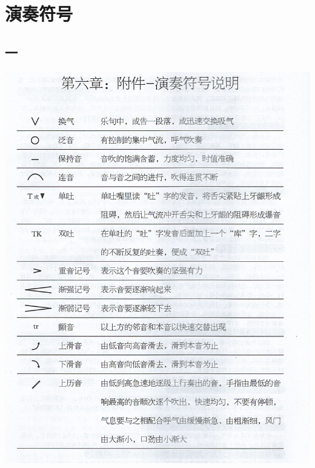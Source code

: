 \documentclass[cn,pad,chinese,chinesefont=nofont]{elegantbook}
\begin{document}
\chapter{演奏符号}
\section{一}
\includegraphics[height=0.8\textheight]{dongxiao/Scan 24.jpeg}
\end{document}
